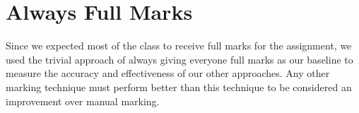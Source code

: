 \section{Always Full Marks}
\label{sec:ctm-full-marks}

Since we expected most of the class to receive full marks for the assignment, we used the trivial approach of always giving everyone full marks as our baseline to measure the accuracy and effectiveness of our other approaches. Any other marking technique must perform better than this  technique to be considered an improvement over manual marking.
